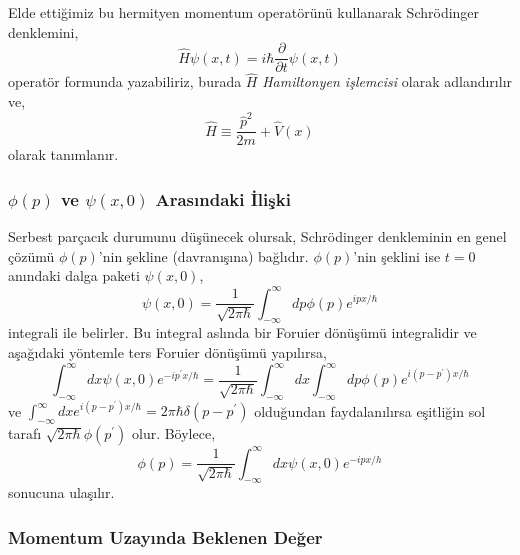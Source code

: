 \documentclass[a4paper,12pt, twoside]{article}
\begin{document}
Elde ettiğimiz bu hermityen momentum operatörünü kullanarak Schrödinger denklemini,
\begin{equation}
\hat H\psi(x,t) = i\hbar \dfrac{\partial}{\partial t}\psi(x,t)
\label{eq:schrodinger_operator_form}
\end{equation}
operatör formunda yazabiliriz, burada $\hat H$ \emph{Hamiltonyen işlemcisi} olarak adlandırılır ve,
\begin{equation}
\hat H \equiv \frac{\hat p^2}{2 m} + \hat V(x)
\label{eq:schrodinger_operator_form}
\end{equation}
olarak tanımlanır.


\subsubsection{$\phi\left(p\right)$  ve $\psi\left( x,0\right)$ Arasındaki İlişki}

Serbest parçacık durumunu düşünecek olursak, Schrödinger denkleminin en genel çözümü $\phi(p)$'nin şekline (davranışına) bağlıdır. $\phi(p)$'nin şeklini ise $t=0$ anındaki dalga paketi $\psi(x,0)$,
\begin{equation}
\psi \left( x,0\right) =\dfrac {1}{\sqrt {2\pi \hbar }}\int ^{\infty }_{-\infty }dp\phi \left( p\right) e^{i px /\hbar }
\label{eq:wave_packet_in_t0}
\end{equation}
integrali ile belirler. Bu integral aslında bir Foruier dönüşümü integralidir ve aşağıdaki yöntemle ters Foruier dönüşümü yapılırsa,
\begin{equation}
\int _ { - \infty } ^ { \infty } d x \psi ( x , 0 ) e ^ { - i p ^ { \prime } x / \hbar } = \frac { 1 } { \sqrt { 2 \pi \hbar } } \int _ { - \infty } ^ { \infty } d x \int _ { - \infty } ^ { \infty } d p \phi ( p ) e ^ { i \left( p - p ^ { \prime } \right) x / \hbar }
\label{eq:wave_packet_in_p_t0}
\end{equation}
ve $\int _ { - \infty } ^ { \infty } d x e ^ { i \left( p - p ^ { \prime } \right) x/\hbar } = 2 \pi \hbar \delta \left( p - p ^ { \prime } \right)$ olduğundan faydalanılırsa eşitliğin sol tarafı $\sqrt { 2 \pi  \hbar } \phi \left( p ^ { \prime } \right)$ olur. Böylece,
\begin{equation}
\phi ( p ) = \frac { 1 } { \sqrt { 2 \pi \hbar } } \int _ { - \infty } ^ { \infty } d x \psi ( x , 0 ) e ^ { - i p x/ h }
\end{equation}
sonucuna ulaşılır. 


\subsubsection{Momentum Uzayında Beklenen Değer}
\end{document}
